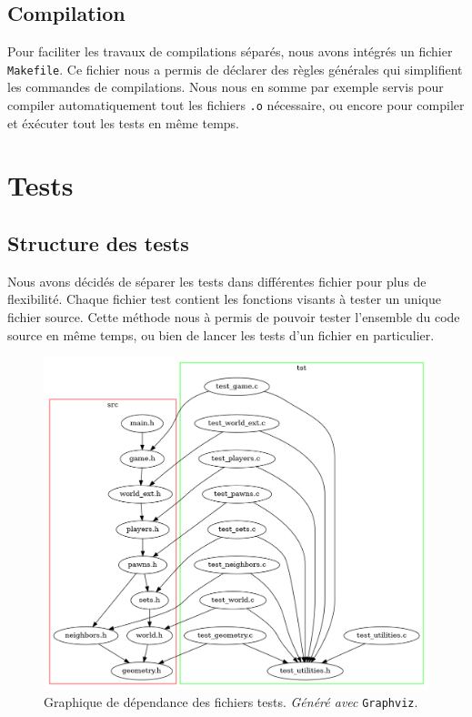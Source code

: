     \subsection{Compilation}
        Pour faciliter les travaux de compilations séparés, nous avons intégrés un fichier \texttt{Makefile}. Ce fichier nous a permis de déclarer des règles générales qui simplifient les commandes de compilations. Nous nous en somme par exemple servis pour compiler automatiquement tout les fichiers \texttt{.o} nécessaire, ou encore pour compiler et éxécuter tout les tests en même temps.

\section{Tests}
    \subsection{Structure des tests}
        Nous avons décidés de séparer les tests dans différentes fichier pour plus de flexibilité. Chaque fichier test contient les fonctions visants à tester un unique fichier source. Cette méthode nous à permis de pouvoir tester l'ensemble du code source en même temps, ou bien de lancer les tests d'un fichier en particulier. \\

        \begin{figure}[H]
            \centering
            \includegraphics[scale=0.4]{img/graph_tst.png}
            \caption{Graphique de dépendance des fichiers tests. \textit{Généré avec} \texttt{Graphviz}.}
            \label{fig:graph_tst}
        \end{figure}

